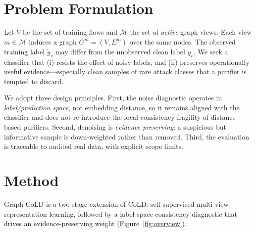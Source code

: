 \documentclass[preprint,3p,times]{elsarticle}
\begin{document}
\section{Problem Formulation}
\label{sec:problem}
Let $V$ be the set of training flows and $\mathcal{M}$ the set of \emph{active}
graph views. Each view $m\in\mathcal{M}$ induces a graph $G^{m}=(V,E^{m})$ over the
same nodes. The observed training label $\tilde{y}_v$ may differ from the
unobserved clean label $y_v$. We seek a classifier that (i) resists the effect of
noisy labels, and (ii) preserves operationally useful evidence—especially clean
samples of rare attack classes that a purifier is tempted to discard.

We adopt three design principles. First, the noise diagnostic operates in
\emph{label/prediction space}, not embedding distance, so it remains aligned with
the classifier and does not re-introduce the local-consistency fragility of
distance-based purifiers. Second, denoising is \emph{evidence preserving}: a
suspicious but informative sample is down-weighted rather than removed. Third, the
evaluation is traceable to audited real data, with explicit scope limits.

\section{Method}
\label{sec:method}
Graph-CoLD is a two-stage extension of CoLD: self-supervised multi-view
representation learning, followed by a label-space consistency diagnostic that
drives an evidence-preserving weight (Figure~\ref{fig:overview}).
\end{document}
